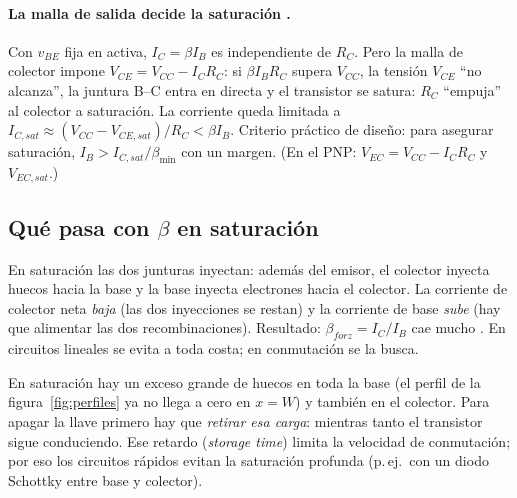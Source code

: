 \paragraph{La malla de salida decide la saturación .} Con $v_{BE}$ fija en activa,
$I_C=\beta I_B$ es independiente de $R_C$. Pero la malla de colector impone
$V_{CE}=V_{CC}-I_CR_C$: si $\beta I_BR_C$ supera $V_{CC}$, la tensión $V_{CE}$ ``no alcanza'',
la juntura B--C entra en directa y el transistor se satura: $R_C$ ``empuja'' al colector a
saturación. La corriente queda limitada a $I_{C,sat}\approx(V_{CC}-V_{CE,sat})/R_C<\beta I_B$.
Criterio práctico de diseño: para asegurar saturación, $I_B>I_{C,sat}/\beta_{\min}$ con un margen.
(En el PNP: $V_{EC}=V_{CC}-I_CR_C$ y $V_{EC,sat}$.)

\subsection{Qué pasa con $\beta$ en saturación}

En saturación las dos junturas inyectan: además del emisor, el colector inyecta huecos hacia
la base y la base inyecta electrones hacia el colector. La corriente de colector neta
\emph{baja} (las dos inyecciones se restan) y la corriente de base \emph{sube} (hay que
alimentar las dos recombinaciones). Resultado: $\beta_{forz}=I_C/I_B$ cae mucho
. En circuitos lineales se evita a toda costa; en conmutación se la busca.

\begin{intuicion}
En saturación hay un exceso grande de huecos en toda la base (el perfil de la
figura~\ref{fig:perfiles} ya no llega a cero en $x=W$) y también en el colector. Para apagar la
llave primero hay que \emph{retirar esa carga}: mientras tanto el transistor sigue conduciendo.
Ese retardo (\emph{storage time}) limita la velocidad de conmutación; por eso los circuitos
rápidos evitan la saturación profunda (p.\,ej.\ con un diodo Schottky entre base y colector).
\end{intuicion}
